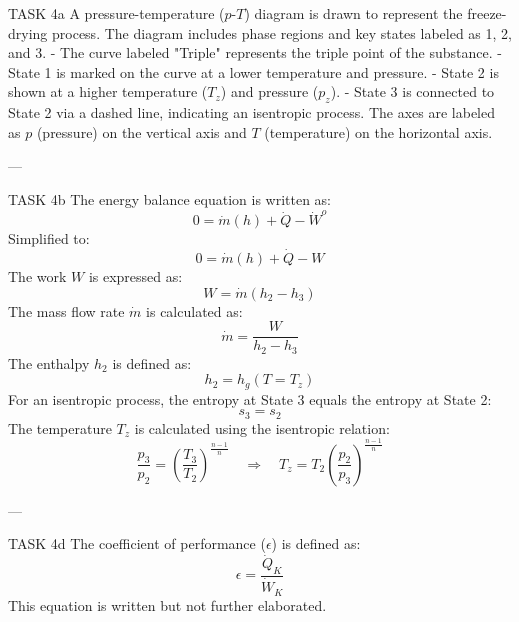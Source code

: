 TASK 4a  
A pressure-temperature (\(p\)-\(T\)) diagram is drawn to represent the freeze-drying process. The diagram includes phase regions and key states labeled as 1, 2, and 3.  
- The curve labeled "Triple" represents the triple point of the substance.  
- State 1 is marked on the curve at a lower temperature and pressure.  
- State 2 is shown at a higher temperature (\(T_z\)) and pressure (\(p_z\)).  
- State 3 is connected to State 2 via a dashed line, indicating an isentropic process.  
The axes are labeled as \(p\) (pressure) on the vertical axis and \(T\) (temperature) on the horizontal axis.

---

TASK 4b  
The energy balance equation is written as:  
\[
0 = \dot{m}(h) + \dot{Q} - \dot{W}^o
\]  
Simplified to:  
\[
0 = \dot{m}(h) + \dot{Q} - W
\]  
The work \(W\) is expressed as:  
\[
W = \dot{m}(h_2 - h_3)
\]  
The mass flow rate \(\dot{m}\) is calculated as:  
\[
\dot{m} = \frac{W}{h_2 - h_3}
\]  
The enthalpy \(h_2\) is defined as:  
\[
h_2 = h_g(T = T_z)
\]  
For an isentropic process, the entropy at State 3 equals the entropy at State 2:  
\[
s_3 = s_2
\]  
The temperature \(T_z\) is calculated using the isentropic relation:  
\[
\frac{p_3}{p_2} = \left(\frac{T_3}{T_2}\right)^{\frac{n-1}{n}} \quad \Rightarrow \quad T_z = T_2 \left(\frac{p_2}{p_3}\right)^{\frac{n-1}{n}}
\]

---

TASK 4d  
The coefficient of performance (\(\epsilon\)) is defined as:  
\[
\epsilon = \frac{\dot{Q}_K}{\dot{W}_K}
\]  
This equation is written but not further elaborated.